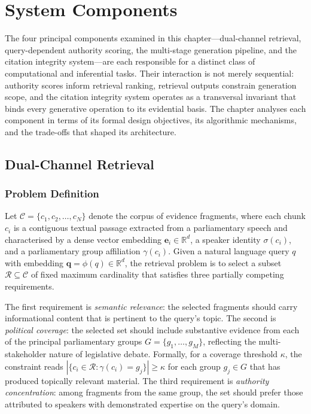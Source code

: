 
\section{System Components}
\label{sec:system-components}

The four principal components examined in this chapter---dual-channel retrieval, query-dependent
authority scoring, the multi-stage generation pipeline, and the citation integrity system---are
each responsible for a distinct class of computational and inferential tasks. Their interaction
is not merely sequential: authority scores inform retrieval ranking, retrieval outputs constrain
generation scope, and the citation integrity system operates as a transversal invariant that
binds every generative operation to its evidential basis. The chapter analyses each component in
terms of its formal design objectives, its algorithmic mechanisms, and the trade-offs that shaped
its architecture.


\subsection{Dual-Channel Retrieval}
\label{sec:dual-channel-retrieval}

\subsubsection{Problem Definition}

Let $\mathcal{C} = \{c_1, c_2, \ldots, c_N\}$ denote the corpus of evidence fragments, where
each chunk $c_i$ is a contiguous textual passage extracted from a parliamentary speech and
characterised by a dense vector embedding $\mathbf{e}_i \in \mathbb{R}^d$, a speaker identity
$\sigma(c_i)$, and a parliamentary group affiliation $\gamma(c_i)$. Given a natural language
query $q$ with embedding $\mathbf{q} = \phi(q) \in \mathbb{R}^d$, the retrieval problem
is to select a subset $\mathcal{R} \subseteq \mathcal{C}$ of fixed maximum cardinality that
satisfies three partially competing requirements.

The first requirement is \textit{semantic relevance}: the selected fragments should carry
informational content that is pertinent to the query's topic. The second is \textit{political
coverage}: the selected set should include substantive evidence from each of the principal
parliamentary groups $G = \{g_1, \ldots, g_M\}$, reflecting the multi-stakeholder nature of
legislative debate. Formally, for a coverage threshold $\kappa$, the constraint reads
$|\{c_i \in \mathcal{R} : \gamma(c_i) = g_j\}| \geq \kappa$ for each group $g_j \in G$ that
has produced topically relevant material. The third requirement is \textit{authority
concentration}: among fragments from the same group, the set should prefer those attributed to
speakers with demonstrated expertise on the query's domain.

